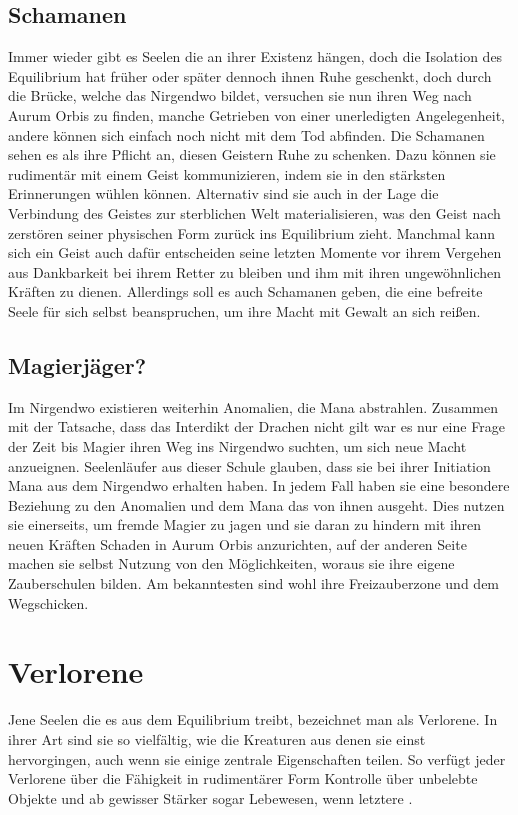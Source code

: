 \documentclass[a4paper,12pt,oneside]{book}
\begin{document}
\subsection{Schamanen}
Immer wieder gibt es Seelen die an ihrer Existenz hängen, doch die Isolation des Equilibrium hat früher oder später dennoch ihnen Ruhe geschenkt, doch durch die Brücke, welche das Nirgendwo bildet, versuchen sie nun ihren Weg nach Aurum Orbis zu finden, manche Getrieben von einer unerledigten Angelegenheit, andere können sich einfach noch nicht mit dem Tod abfinden. Die Schamanen sehen es als ihre Pflicht an, diesen Geistern Ruhe zu schenken. Dazu können sie rudimentär mit einem Geist kommunizieren, indem sie in den stärksten Erinnerungen wühlen können. Alternativ sind sie auch in der Lage die Verbindung des Geistes zur sterblichen Welt materialisieren, was den Geist nach zerstören seiner physischen Form zurück ins Equilibrium zieht. Manchmal kann sich ein Geist auch dafür entscheiden seine letzten Momente vor ihrem Vergehen aus Dankbarkeit bei ihrem Retter zu bleiben und ihm mit ihren ungewöhnlichen Kräften zu dienen. Allerdings soll es auch Schamanen geben, die eine befreite Seele für sich selbst beanspruchen, um ihre Macht mit Gewalt an sich reißen. 
\subsection{Magierjäger?}
Im Nirgendwo existieren weiterhin Anomalien, die Mana abstrahlen. Zusammen mit der Tatsache, dass das Interdikt der Drachen nicht gilt war es nur eine Frage der Zeit bis Magier ihren Weg ins Nirgendwo suchten, um sich neue Macht anzueignen. Seelenläufer aus dieser Schule glauben, dass sie bei ihrer Initiation Mana aus dem Nirgendwo erhalten haben. In jedem Fall haben sie eine besondere Beziehung zu den Anomalien und dem Mana das von ihnen ausgeht. Dies nutzen sie einerseits, um fremde Magier zu jagen und sie daran zu hindern mit ihren neuen Kräften Schaden in Aurum Orbis anzurichten, auf der anderen Seite machen sie selbst Nutzung von den Möglichkeiten, woraus sie ihre eigene Zauberschulen bilden. Am bekanntesten sind wohl ihre Freizauberzone und dem Wegschicken. 


\section{Verlorene}
Jene Seelen die es aus dem Equilibrium treibt, bezeichnet man als Verlorene. In ihrer Art sind sie so vielfältig, wie die Kreaturen aus denen sie einst hervorgingen, auch wenn sie einige zentrale Eigenschaften teilen. So verfügt jeder Verlorene über die Fähigkeit in rudimentärer Form Kontrolle über unbelebte Objekte und ab gewisser Stärker sogar Lebewesen, wenn letztere .
\end{document}
